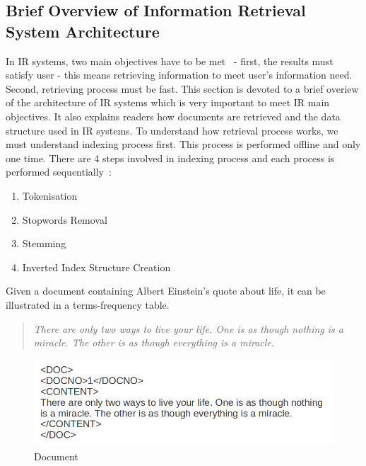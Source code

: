 \subsection{Brief Overview of Information Retrieval System Architecture}\label{section:IRarchitecture}
In IR systems, two main objectives have to be met~\cite{IRarchitecture} - first, the results must satisfy user - this means retrieving information to meet user's
information need. Second, retrieving process must be fast. This section is devoted to a brief overiew of the architecture of IR systems 
which is very important to meet IR main objectives. It also explains readers
how documents are retrieved and the data structure used in IR systems. To understand how retrieval process works, we must understand 
indexing process first. This process is performed offline and only one time. 
There are 4 steps involved in indexing process and each process is performed sequentially~\cite{IRarchitecture}:
\begin{enumerate}
 \item Tokenisation
 \item Stopwords Removal
 \item Stemming
 \item Inverted Index Structure Creation
\end{enumerate}

Given a document containing Albert Einstein's quote about life, it can be illustrated in a terms-frequency table.

\begin{quotation}
 \item \textit{There are only two ways to live your life. One is as though nothing is a miracle. The other is as though everything is a miracle.}
\end{quotation}


\begin{figure}
\centering
\includegraphics[scale=0.5]{./figures/text.png}
\caption{Document} \label{fig:quote} 
\end{figure}


